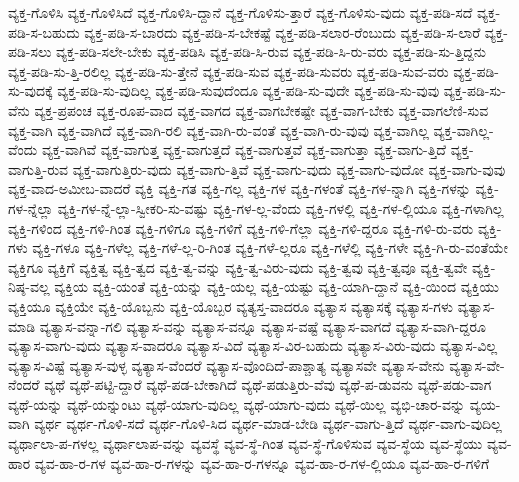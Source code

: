 {ವ್ಯಕ್ತ-ಗೊಳಿಸಿ
ವ್ಯಕ್ತ-ಗೊಳಿಸಿದೆ
ವ್ಯಕ್ತ-ಗೊಳಿಸಿ-ದ್ದಾನೆ
ವ್ಯಕ್ತ-ಗೊಳಿಸು-ತ್ತಾರೆ
ವ್ಯಕ್ತ-ಗೊಳಿಸು-ವುದು
ವ್ಯಕ್ತ-ಪಡಿ-ಸದೆ
ವ್ಯಕ್ತ-ಪಡಿ-ಸ-ಬಹುದು
ವ್ಯಕ್ತ-ಪಡಿ-ಸ-ಬಾರದು
ವ್ಯಕ್ತ-ಪಡಿ-ಸ-ಬೇಕಷ್ಟೆ
ವ್ಯಕ್ತ-ಪಡಿ-ಸಲಾರ-ರೆಂಬುದು
ವ್ಯಕ್ತ-ಪಡಿ-ಸ-ಲಾರೆ
ವ್ಯಕ್ತ-ಪಡಿ-ಸಲು
ವ್ಯಕ್ತ-ಪಡಿ-ಸಲೇ-ಬೇಕು
ವ್ಯಕ್ತ-ಪಡಿಸಿ
ವ್ಯಕ್ತ-ಪಡಿ-ಸಿ-ರುವ
ವ್ಯಕ್ತ-ಪಡಿ-ಸಿ-ರು-ವರು
ವ್ಯಕ್ತ-ಪಡಿ-ಸು-ತ್ತಿದ್ದನು
ವ್ಯಕ್ತ-ಪಡಿ-ಸು-ತ್ತಿ-ರಲಿಲ್ಲ
ವ್ಯಕ್ತ-ಪಡಿ-ಸು-ತ್ತೇನೆ
ವ್ಯಕ್ತ-ಪಡಿ-ಸುವ
ವ್ಯಕ್ತ-ಪಡಿ-ಸುವರು
ವ್ಯಕ್ತ-ಪಡಿ-ಸುವ-ವರು
ವ್ಯಕ್ತ-ಪಡಿ-ಸು-ವುದಕ್ಕೆ
ವ್ಯಕ್ತ-ಪಡಿ-ಸು-ವುದಿಲ್ಲ
ವ್ಯಕ್ತ-ಪಡಿ-ಸುವುದೆಂದೂ
ವ್ಯಕ್ತ-ಪಡಿ-ಸು-ವುದೇ
ವ್ಯಕ್ತ-ಪಡಿ-ಸು-ವುವು
ವ್ಯಕ್ತ-ಪಡಿ-ಸು-ವೆನು
ವ್ಯಕ್ತ-ಪ್ರಪಂಚ
ವ್ಯಕ್ತ-ರೂಪ-ವಾದ
ವ್ಯಕ್ತ-ವಾಗದ
ವ್ಯಕ್ತ-ವಾಗಬೇಕಷ್ಟೇ
ವ್ಯಕ್ತ-ವಾಗ-ಬೇಕು
ವ್ಯಕ್ತ-ವಾಗಲೆಣಿ-ಸುವ
ವ್ಯಕ್ತ-ವಾಗಿ
ವ್ಯಕ್ತ-ವಾಗಿದೆ
ವ್ಯಕ್ತ-ವಾಗಿ-ರಲಿ
ವ್ಯಕ್ತ-ವಾಗಿ-ರು-ವಂತೆ
ವ್ಯಕ್ತ-ವಾಗಿ-ರು-ವುವು
ವ್ಯಕ್ತ-ವಾಗಿಲ್ಲ
ವ್ಯಕ್ತ-ವಾಗಿಲ್ಲ-ವೆಂದು
ವ್ಯಕ್ತ-ವಾಗಿವೆ
ವ್ಯಕ್ತ-ವಾಗುತ್ತ
ವ್ಯಕ್ತ-ವಾಗುತ್ತದೆ
ವ್ಯಕ್ತ-ವಾಗುತ್ತವೆ
ವ್ಯಕ್ತ-ವಾಗುತ್ತಾ
ವ್ಯಕ್ತ-ವಾಗು-ತ್ತಿದೆ
ವ್ಯಕ್ತ-ವಾಗುತ್ತಿ-ರುವ
ವ್ಯಕ್ತ-ವಾಗುತ್ತಿರು-ವುದು
ವ್ಯಕ್ತ-ವಾಗು-ತ್ತಿವೆ
ವ್ಯಕ್ತ-ವಾಗು-ವುದು
ವ್ಯಕ್ತ-ವಾಗು-ವುದೋ
ವ್ಯಕ್ತ-ವಾಗು-ವುವು
ವ್ಯಕ್ತ-ವಾದ-ಅಮೀಬ-ವಾದರೆ
ವ್ಯಕ್ತಿ
ವ್ಯಕ್ತಿ-ಗತ
ವ್ಯಕ್ತಿ-ಗಲ್ಲ
ವ್ಯಕ್ತಿ-ಗಳ
ವ್ಯಕ್ತಿ-ಗಳಂತೆ
ವ್ಯಕ್ತಿ-ಗಳ-ನ್ನಾಗಿ
ವ್ಯಕ್ತಿ-ಗಳನ್ನು
ವ್ಯಕ್ತಿ-ಗಳ-ನ್ನೆಲ್ಲಾ
ವ್ಯಕ್ತಿ-ಗಳ-ನ್ನೆ-ಲ್ಲಾ-ಸ್ವೀಕರಿ-ಸು-ವಷ್ಟು
ವ್ಯಕ್ತಿ-ಗಳ-ಲ್ಲ-ವೆಂದು
ವ್ಯಕ್ತಿ-ಗಳಲ್ಲಿ
ವ್ಯಕ್ತಿ-ಗಳ-ಲ್ಲಿಯೂ
ವ್ಯಕ್ತಿ-ಗಳಾಗಿಲ್ಲ
ವ್ಯಕ್ತಿ-ಗಳಿಂದ
ವ್ಯಕ್ತಿ-ಗಳಿ-ಗಿಂತ
ವ್ಯಕ್ತಿ-ಗಳಿಗೂ
ವ್ಯಕ್ತಿ-ಗಳಿಗೆ
ವ್ಯಕ್ತಿ-ಗಳಿ-ಗೆಲ್ಲಾ
ವ್ಯಕ್ತಿ-ಗಳಿ-ದ್ದರೂ
ವ್ಯಕ್ತಿ-ಗಳಿ-ರು-ವರು
ವ್ಯಕ್ತಿ-ಗಳು
ವ್ಯಕ್ತಿ-ಗಳೂ
ವ್ಯಕ್ತಿ-ಗಳೆಲ್ಲ
ವ್ಯಕ್ತಿ-ಗಳೆ-ಲ್ಲ-ರಿ-ಗಿಂತ
ವ್ಯಕ್ತಿ-ಗಳೆ-ಲ್ಲರೂ
ವ್ಯಕ್ತಿ-ಗಳೆಲ್ಲಿ
ವ್ಯಕ್ತಿ-ಗಳೇ
ವ್ಯಕ್ತಿ-ಗಿ-ರು-ವಂತೆಯೇ
ವ್ಯಕ್ತಿಗೂ
ವ್ಯಕ್ತಿಗೆ
ವ್ಯಕ್ತಿತ್ವ
ವ್ಯಕ್ತಿ-ತ್ವದ
ವ್ಯಕ್ತಿ-ತ್ವ-ವನ್ನು
ವ್ಯಕ್ತಿ-ತ್ವ-ವಿರು-ವುದು
ವ್ಯಕ್ತಿ-ತ್ವವು
ವ್ಯಕ್ತಿ-ತ್ವವೂ
ವ್ಯಕ್ತಿ-ತ್ವವೇ
ವ್ಯಕ್ತಿ-ನಿಷ್ಠ-ವಲ್ಲ
ವ್ಯಕ್ತಿಯ
ವ್ಯಕ್ತಿ-ಯಂತೆ
ವ್ಯಕ್ತಿ-ಯನ್ನು
ವ್ಯಕ್ತಿ-ಯಲ್ಲ
ವ್ಯಕ್ತಿ-ಯಷ್ಟು
ವ್ಯಕ್ತಿ-ಯಾಗಿ-ದ್ದಾನೆ
ವ್ಯಕ್ತಿ-ಯಿಂದ
ವ್ಯಕ್ತಿಯು
ವ್ಯಕ್ತಿಯೂ
ವ್ಯಕ್ತಿಯೇ
ವ್ಯಕ್ತಿ-ಯೊಬ್ಬನು
ವ್ಯಕ್ತಿ-ಯೊಬ್ಬರ
ವ್ಯತ್ಯಸ್ತ-ವಾದರೂ
ವ್ಯತ್ಯಾಸ
ವ್ಯತ್ಯಾಸಕ್ಕೆ
ವ್ಯತ್ಯಾಸ-ಗಳು
ವ್ಯತ್ಯಾಸ-ಮಾಡಿ
ವ್ಯತ್ಯಾಸ-ವನ್ನಾ-ಗಲಿ
ವ್ಯತ್ಯಾಸ-ವನ್ನು
ವ್ಯತ್ಯಾಸ-ವನ್ನೂ
ವ್ಯತ್ಯಾಸ-ವಷ್ಟೆ
ವ್ಯತ್ಯಾಸ-ವಾಗದೆ
ವ್ಯತ್ಯಾಸ-ವಾಗಿ-ದ್ದರೂ
ವ್ಯತ್ಯಾಸ-ವಾಗು-ವುದು
ವ್ಯತ್ಯಾಸ-ವಾದರೂ
ವ್ಯತ್ಯಾಸ-ವಿದೆ
ವ್ಯತ್ಯಾಸ-ವಿರ-ಬಹುದು
ವ್ಯತ್ಯಾಸ-ವಿರು-ವುದು
ವ್ಯತ್ಯಾಸ-ವಿಲ್ಲ
ವ್ಯತ್ಯಾಸ-ವಿಷ್ಟೆ
ವ್ಯತ್ಯಾಸ-ವುಳ್ಳ
ವ್ಯತ್ಯಾಸ-ವೆಂದರೆ
ವ್ಯತ್ಯಾಸ-ವೊಂದಿದೆ-ಪಾಶ್ಚಾತ್ಯ
ವ್ಯತ್ಯಾಸವೇ
ವ್ಯತ್ಯಾಸ-ವೇನು
ವ್ಯತ್ಯಾಸ-ವೇ-ನೆಂದರೆ
ವ್ಯಥೆ
ವ್ಯಥೆ-ಪಟ್ಟಿ-ದ್ದಾರೆ
ವ್ಯಥೆ-ಪಡ-ಬೇಕಾಗಿದೆ
ವ್ಯಥೆ-ಪಡುತ್ತಿರು-ವೆವು
ವ್ಯಥೆ-ಪ-ಡುವನು
ವ್ಯಥೆ-ಪಡು-ವಾಗ
ವ್ಯಥೆ-ಯನ್ನು
ವ್ಯಥೆ-ಯನ್ನುಂಟು
ವ್ಯಥೆ-ಯಾಗು-ವುದಿಲ್ಲ
ವ್ಯಥೆ-ಯಾಗು-ವುದು
ವ್ಯಥೆ-ಯಿಲ್ಲ
ವ್ಯಭಿ-ಚಾರ-ವನ್ನು
ವ್ಯಯ-ವಾಗಿ
ವ್ಯರ್ಥ
ವ್ಯರ್ಥ-ಗೊಳಿ-ಸದೆ
ವ್ಯರ್ಥ-ಗೊಳಿ-ಸಿದ
ವ್ಯರ್ಥ-ಮಾಡ-ಬೇಡಿ
ವ್ಯರ್ಥ-ವಾಗು-ತ್ತಿದೆ
ವ್ಯರ್ಥ-ವಾಗು-ವುದಿಲ್ಲ
ವ್ಯರ್ಥಾಲಾ-ಪ-ಗಳಲ್ಲ
ವ್ಯರ್ಥಾಲಾಪ-ವನ್ನು
ವ್ಯವಸ್ಥೆ
ವ್ಯವ-ಸ್ಥೆ-ಗಿಂತ
ವ್ಯವ-ಸ್ಥೆ-ಗೊಳಿಸುವ
ವ್ಯವ-ಸ್ಥೆಯ
ವ್ಯವ-ಸ್ಥೆಯು
ವ್ಯವ-ಹಾರ
ವ್ಯವ-ಹಾ-ರ-ಗಳ
ವ್ಯವ-ಹಾ-ರ-ಗಳನ್ನು
ವ್ಯವ-ಹಾ-ರ-ಗಳನ್ನೂ
ವ್ಯವ-ಹಾ-ರ-ಗಳ-ಲ್ಲಿಯೂ
ವ್ಯವ-ಹಾ-ರ-ಗಳಿಗೆ
}
